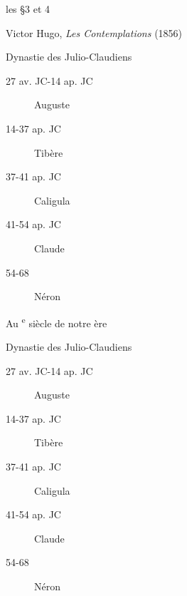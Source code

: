 \documentclass[12pt,a4paper]{article}
\newcommand{\prg}[1]{\S #1\xspace}%
\newcommand{\oeuvre}[3]{#1, \emph{#2} (#3)}%
\newcommand{\siecle}[1]{\textsc{\romannum{#1}}\textsuperscript{e} siècle\xspace}
\newenvironment{chronologie}[1]{\par #1\begin{description}}{\end{description}}
\begin{document}
les \prg{3} et 4

\oeuvre{Victor Hugo}{Les Contemplations}{1856}

    \begin{chronologie}{Dynastie des Julio-Claudiens}
    \item[27 av. JC-14 ap. JC] Auguste
    \item[14-37 ap. JC] Tibère
    \item[37-41 ap. JC] Caligula
    \item[41-54 ap. JC] Claude
    \item[54-68] Néron
    \end{chronologie}
    



Au \siecle{3} de notre ère


    \begin{chronologie}{Dynastie des Julio-Claudiens}
    \item[27 av. JC-14 ap. JC] Auguste
    \item[14-37 ap. JC] Tibère
    \item[37-41 ap. JC] Caligula
    \item[41-54 ap. JC] Claude
    \item[54-68] Néron
    \end{chronologie}
\end{document}

